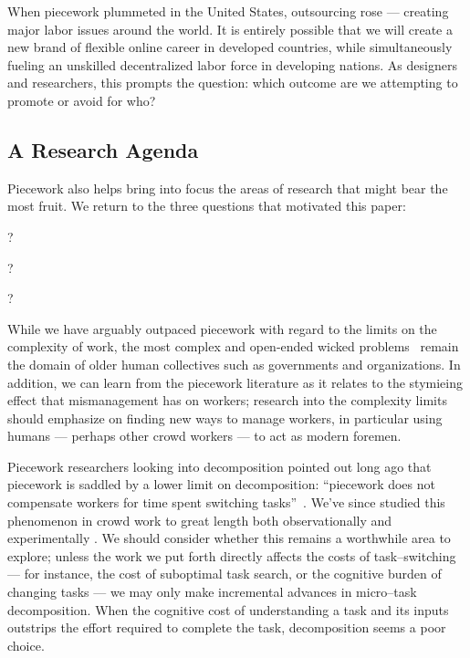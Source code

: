 \documentclass[trackingWork]{subfiles}
\begin{document}
When piecework plummeted in the United States, outsourcing rose --- creating major labor issues around the world.
It is entirely possible that we will create a new brand of flexible online career in developed countries, while simultaneously fueling an unskilled decentralized labor force in developing nations.
As designers and researchers, this prompts the question: which outcome are we attempting to promote or avoid for who?


\subsection{A Research Agenda}\label{sec:whatShouldBeTheFuture}
Piecework also helps bring into focus the
areas of research that might bear the most fruit.
We return to the three questions that motivated this paper:
\begin{inlinelist}
  \item {}?
  \item {}?
  \item {}?
\end{inlinelist}

While we have arguably outpaced piecework with regard to the limits on the complexity of work,
the most complex and open-ended wicked problems~\cite{rittel1973dilemmas} remain the domain of older human collectives such as governments and organizations. 
In addition, we can learn from the piecework literature as it relates to
the stymieing effect that mismanagement has on workers;
research into the complexity limits should emphasize on finding new ways to manage workers,
in particular using humans --- perhaps other crowd workers ---
to act as modern foremen.

Piecework researchers looking into decomposition pointed out long ago that
piecework is saddled by a lower limit on decomposition:
``piecework does not compensate workers for time spent switching tasks''~\cite{bewley1999wages}. %
We've since studied this phenomenon in crowd work to great length both
observationally \cite{taskSearch} and
experimentally \cite{delayAndOrderLasecki}.
We should consider whether this remains a worthwhile area to explore;
unless the work we put forth directly affects the costs of task--switching
--- for instance, the cost of suboptimal task search, or the cognitive burden of changing tasks ---
we may only make incremental advances in micro--task decomposition.
When the cognitive cost of understanding a task and its inputs outstrips the effort required to complete the task, decomposition seems a poor choice.
\end{document}
